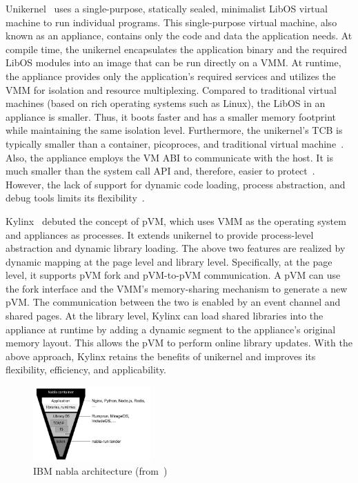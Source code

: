 Unikernel~\cite*{10.1145/2499368.2451167} uses a single-purpose, statically sealed, minimalist LibOS virtual machine to run individual programs. This single-purpose virtual machine, also known as an appliance, contains only the code and data the application needs. At compile time, the unikernel encapsulates the application 
binary and the required LibOS modules into an image that can be run directly on a VMM. At runtime, the appliance provides only the application's required services and utilizes the VMM for isolation and resource multiplexing. Compared to traditional virtual machines (based on rich operating systems 
such as Linux), the LibOS in an appliance is smaller. Thus, it boots faster and has a smaller memory footprint while maintaining the same isolation level. Furthermore, the unikernel's TCB is typically smaller than a container, picoproces, and traditional virtual machine~\cite*{10.1145/3436512}. Also, the appliance 
employs the VM ABI to communicate with the host. It is much smaller than the system call API and, therefore, easier to protect~\cite*{10.1145/3436512}. However, the lack of support for dynamic code loading, process abstraction, and debug tools limits its flexibility~\cite*{10.1145/3436512, 10.1145/3267809.3267845}.

Kylinx~\cite*{10.1145/3436512} debuted the concept of pVM, which uses VMM as the operating system and appliances as processes. It extends unikernel to provide process-level abstraction and dynamic library loading. The above two features are realized by dynamic mapping at the page level and library level. 
Specifically, at the page level, it supports pVM fork and pVM-to-pVM communication. A pVM can use the fork interface and the VMM's memory-sharing mechanism to generate a new pVM. The communication between the two is enabled by an event channel and shared pages. At the library level, Kylinx 
can load shared libraries into the appliance at runtime by adding a dynamic segment to the appliance's original memory layout. This allows the pVM to perform online library updates. With the above approach, Kylinx retains the benefits of unikernel and improves its flexibility, efficiency, 
and applicability.
 
\begin{figure}[htp]
    \centering
    \includegraphics[width=0.4\textwidth]{images/nabla.png}
    \caption[IBM nabla architecture]{IBM nabla architecture (from~\cite*{Nabla})}
    \label{fig:nabla}
\end{figure}

